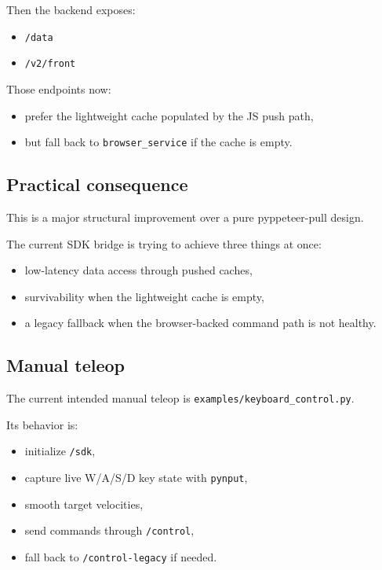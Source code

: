 \documentclass[11pt,a4paper]{article}
\begin{document}
Then the backend exposes:

\begin{itemize}[nosep]
  \item \texttt{/data}
  \item \texttt{/v2/front}
\end{itemize}

Those endpoints now:

\begin{itemize}[nosep]
  \item prefer the lightweight cache populated by the JS push path,
  \item but fall back to \texttt{browser\_service} if the cache is empty.
\end{itemize}

\subsection{Practical consequence}

This is a major structural improvement over a pure pyppeteer-pull design.

The current SDK bridge is trying to achieve three things at once:

\begin{itemize}[nosep]
  \item low-latency data access through pushed caches,
  \item survivability when the lightweight cache is empty,
  \item a legacy fallback when the browser-backed command path is not healthy.
\end{itemize}

\subsection{Manual teleop}

The current intended manual teleop is \texttt{examples/keyboard\_control.py}.

Its behavior is:

\begin{itemize}[nosep]
  \item initialize \texttt{/sdk},
  \item capture live W/A/S/D key state with \texttt{pynput},
  \item smooth target velocities,
  \item send commands through \texttt{/control},
  \item fall back to \texttt{/control-legacy} if needed.
\end{itemize}
\end{document}
